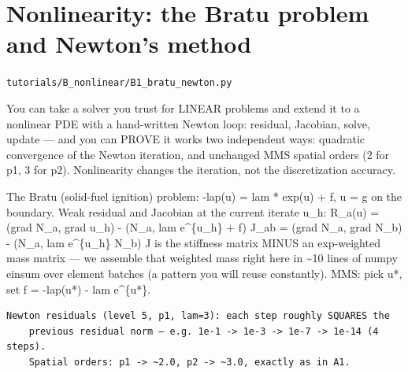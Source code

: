 \chapter{Nonlinearity: the Bratu problem and Newton's method}
\label{ch:B1_bratu_newton}
\noindent\texttt{tutorials/B\_nonlinear/B1\_bratu\_newton.py}\\[0.75em]
\begin{outcome}
You can take a solver you trust for LINEAR problems and
extend it to a nonlinear PDE with a hand-written Newton loop: residual,
Jacobian, solve, update — and you can PROVE it works two independent ways:
quadratic convergence of the Newton iteration, and unchanged MMS spatial
orders (2 for p1, 3 for p2). Nonlinearity changes the iteration, not the
discretization accuracy.
\end{outcome}

The Bratu (solid-fuel ignition) problem:
    -lap(u) = lam * exp(u) + f,     u = g on the boundary.
Weak residual and Jacobian at the current iterate u\_h:
    R\_a(u) = (grad N\_a, grad u\_h) - (N\_a, lam e\textasciicircum{}\{u\_h\} + f)
    J\_ab   = (grad N\_a, grad N\_b) - (N\_a, lam e\textasciicircum{}\{u\_h\} N\_b)
J is the stiffness matrix MINUS an exp-weighted mass matrix — we assemble
that weighted mass right here in \textasciitilde{}10 lines of numpy einsum over element
batches (a pattern you will reuse constantly). MMS: pick u*, set
f = -lap(u*) - lam e\textasciicircum{}\{u*\}.

\begin{expected}
\begin{verbatim}
Newton residuals (level 5, p1, lam=3): each step roughly SQUARES the
    previous residual norm — e.g. 1e-1 -> 1e-3 -> 1e-7 -> 1e-14 (4 steps).
    Spatial orders: p1 -> ~2.0, p2 -> ~3.0, exactly as in A1.
\end{verbatim}
\end{expected}

